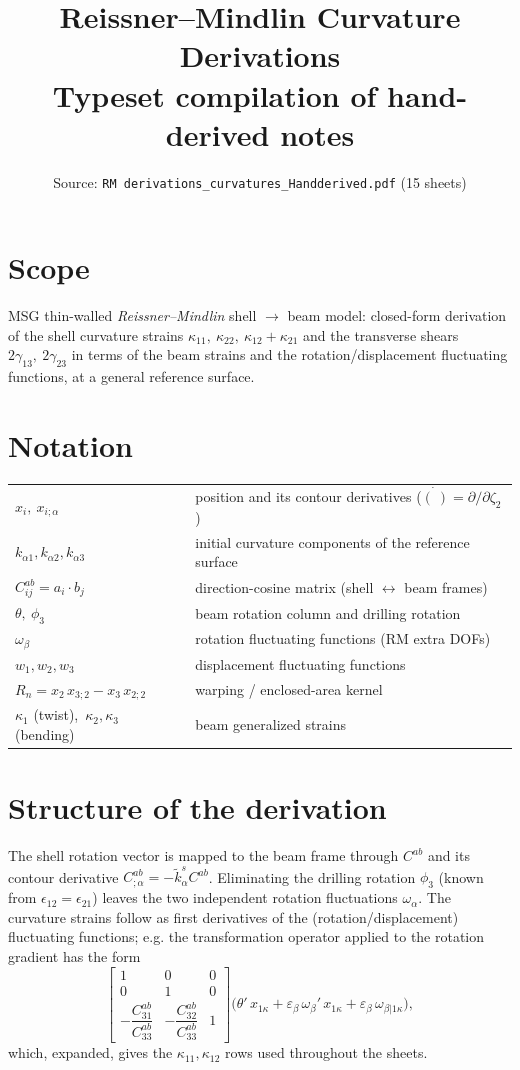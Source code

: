 \documentclass[11pt]{article}
\title{\color{navy}\bfseries Reissner--Mindlin Curvature Derivations\\
       \large\mdseries Typeset compilation of hand-derived notes}
\author{}
\date{Source: \texttt{RM derivations\_curvatures\_Handderived.pdf} (15 sheets)}
\begin{document}
\maketitle
\thispagestyle{fancy}

\section*{Scope}
MSG thin-walled \emph{Reissner--Mindlin} shell $\rightarrow$ beam model: closed-form
derivation of the shell curvature strains
$\kappa_{11},\ \kappa_{22},\ \kappa_{12}+\kappa_{21}$ and the transverse shears
$2\gamma_{13},\ 2\gamma_{23}$ in terms of the beam strains and the
rotation/displacement fluctuating functions, at a general reference surface.

\section*{Notation}
\begin{tabular}{@{}ll@{}}
$x_i,\ x_{i;\alpha}$ & position and its contour derivatives ($\dot{(\ )}=\partial/\partial\zeta_2$)\\
$k_{\alpha 1},k_{\alpha 2},k_{\alpha 3}$ & initial curvature components of the reference surface\\
$C^{ab}_{ij}=a_i\!\cdot\! b_j$ & direction-cosine matrix (shell $\leftrightarrow$ beam frames)\\
$\theta,\ \phi_3$ & beam rotation column and drilling rotation\\
$\omega_\beta$ & rotation fluctuating functions (RM extra DOFs)\\
$w_1,w_2,w_3$ & displacement fluctuating functions\\
$R_n=x_2\,x_{3;2}-x_3\,x_{2;2}$ & warping / enclosed-area kernel\\
$\kappa_1$ (twist),\ $\kappa_2,\kappa_3$ (bending) & beam generalized strains\\
\end{tabular}

\section*{Structure of the derivation}
The shell rotation vector is mapped to the beam frame through $C^{ab}$ and its
contour derivative $C^{ab}_{;\alpha}=-\tilde k^{s}_{\alpha}C^{ab}$. Eliminating the
drilling rotation $\phi_3$ (known from $\epsilon_{12}=\epsilon_{21}$) leaves the two
independent rotation fluctuations $\omega_\alpha$. The curvature strains follow as
first derivatives of the (rotation/displacement) fluctuating functions; e.g. the
transformation operator applied to the rotation gradient has the form
\[
\begin{bmatrix} 1 & 0 & 0\\[1pt] 0 & 1 & 0\\[1pt]
-\dfrac{C^{ab}_{31}}{C^{ab}_{33}} & -\dfrac{C^{ab}_{32}}{C^{ab}_{33}} & 1 \end{bmatrix}
\bigl(\theta'\,x_{1\kappa}+\varepsilon_\beta\,\omega_\beta'\,x_{1\kappa}
      +\varepsilon_\beta\,\omega_{\beta|1\kappa}\bigr),
\]
which, expanded, gives the $\kappa_{11},\kappa_{12}$ rows used throughout the sheets.
\end{document}
